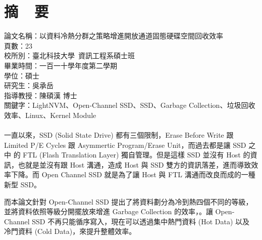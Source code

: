 \chapter*{摘~~要}


\noindent
論文名稱：以資料冷熱分群之策略增進開放通道固態硬碟空間回收效率 \\%
頁數：23\\
校所別：臺北科技大學~資訊工程系碩士班\\
畢業時間：一百一十學年度第二學期\\
學位：碩士\\
研究生：吳承岳\\
指導教授：陳碩漢 博士\\
\noindent
關鍵字：LightNVM、Open-Channel SSD、SSD、Garbage Collection、垃圾回收效率、Linux、Kernel Module\\
\hspace*{\fill}\\
%
\indent
一直以來，SSD (Solid State Drive) 都有三個限制，Erase Before Write 跟 Limited P/E Cycles 跟 Asymmertic Program/Erase Unit，而過去都是讓 SSD 之中 的 FTL (Flash Translation Layer) 獨自管理。但是這樣 SSD 並沒有 Host 的資訊，也就是並沒有跟 Host 溝通，造成 Host 與 SSD 雙方的資訊落差，進而導致效率下降。而 Open Channel SSD 就是為了讓 Host 與 FTL 溝通而改良而成的一種新型 SSD。

\indent
而本論文針對 Open-Channel SSD 提出了將資料劃分為冷到熱四個不同的等級，並將資料依照等級分開擺放來增進 Garbage Collection 的效率，。讓 Open-Channel SSD 不再只能循序寫入，現在可以透過集中熱門資料 (Hot Data) 以及 冷門資料 (Cold Data)，來提升整體效率。



